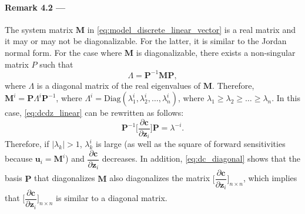 \documentclass{article}
\begin{document}
\textcolor{rev}{\paragraph{Remark 4.2 ---} The system matrix $\mathbf{M}$ in \cref{eq:model_discrete_linear_vector} is a real matrix and it may or may not be diagonalizable. For the latter, it is similar to the Jordan normal form. For the case where $\mathbf{M}$ is diagonalizable, there exists a non-singular matrix $P$ such that
\begin{equation}
    \Lambda = \mathbf{P}^{-1} \mathbf{M} \mathbf{P},
\end{equation}
where $\Lambda$ is a diagonal matrix of the real eigenvalues of $\mathbf{M}$. Therefore, $\mathbf{M}^i=\mathbf{P} \Lambda^i \mathbf{P}^{-1}$, where $\Lambda^i = \text{Diag}(\lambda_1^i, \lambda_2^i, \dots, \lambda_n^i)$, where $\lambda_1 \ge \lambda_2 \ge \dots \ge \lambda_n$. In this case, \cref{eq:dcdz_linear} can be rewritten as follows:
\begin{equation}
    \mathbf{P}^{-1} \bigg[\dfrac{\partial \mathbf{c}}{\partial \mathbf{z}_i} \bigg] \mathbf{P} =\lambda^{-i}. \label{eq:dc_diagonal}
\end{equation}
Therefore, if $|\lambda_k|>1$, $\lambda_k^{i}$ is large (as well as the square of forward sensitivities because $\mathbf{u}_i = \mathbf{M}^i$) and $\dfrac{\partial \mathbf{c}}{\partial \mathbf{z}_i}$ decreases. In addition, \cref{eq:dc_diagonal} shows that the basis $\mathbf{P}$ that diagonalizes $\mathbf{M}$ also diagonalizes the matrix $\bigg[\dfrac{\partial \mathbf{c}}{\partial \mathbf{z}_i}\bigg]_{n\times n}$, which implies that $\bigg[\dfrac{\partial \mathbf{c}}{\partial \mathbf{z}_i}\bigg]_{n\times n}$ is similar to a diagonal matrix.}

\end{document}
